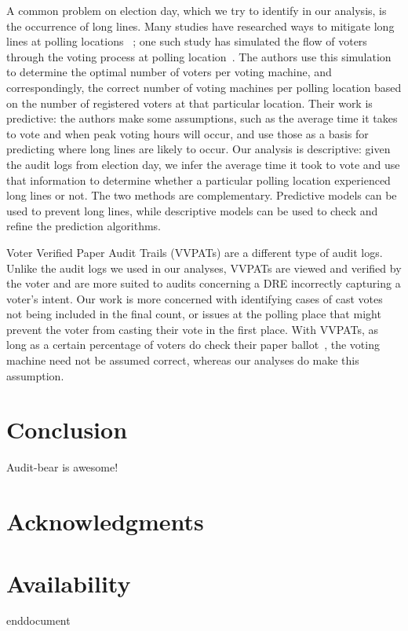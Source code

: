 \documentclass[letterpaper,twocolumn,10pt]{article}
\begin{document}
A common problem on election day, which we try to identify in our analysis, is the occurrence of long lines. Many studies have researched ways to mitigate long lines at polling locations ~\cite{Allen2006,Dow2007,Spencer2010,Wilson2008}; one such study has simulated the flow of voters through the voting process at polling location~\cite{Edel2010}. The authors use this simulation to determine the optimal number of voters per voting machine, and correspondingly, the correct number of voting machines per polling location based on the number of registered voters at that particular location. Their work is predictive: the authors make some assumptions, such as the average time it takes to vote and when peak voting hours will occur, and use those as a basis for predicting where long lines are likely to occur. Our analysis is descriptive: given the audit logs from election day, we infer the average time it took to vote and use that information to determine whether a particular polling location experienced long lines or not. The two methods are complementary. Predictive models can be used to prevent long lines, while descriptive models can be used to check and refine the prediction algorithms.

Voter Verified Paper Audit Trails (VVPATs) are a different type of audit logs. Unlike the audit logs we used in our analyses, VVPATs are viewed and verified by the voter and are more suited to audits concerning a DRE incorrectly capturing a voter\textquoteright s intent. Our work is more concerned with identifying cases of cast votes not being included in the final count, or issues at the polling place that might prevent the voter from casting their vote in the first place. With VVPATs, as long as a certain percentage of voters do check their paper ballot~\cite{Hall2006}, the voting machine need not be assumed correct, whereas our analyses do make this assumption.
\section{Conclusion}
Audit-bear is awesome!

\section{Acknowledgments}
\section{Availability}



{\footnotesize
}

end{document}
\end{document}
